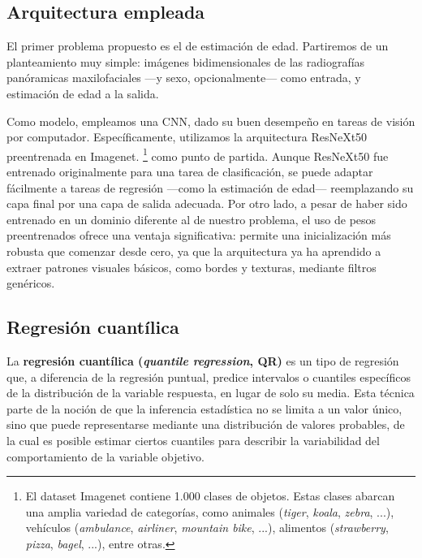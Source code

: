\subsection{Arquitectura empleada}

El primer problema propuesto es el de estimación de edad. Partiremos de un planteamiento muy simple: imágenes 
bidimensionales de las radiografías panóramicas maxilofaciales ---y sexo, opcionalmente---
como entrada, y estimación de edad a la salida.

Como modelo, empleamos una CNN, dado su buen desempeño en tareas de visión por computador. Específicamente,
utilizamos la arquitectura ResNeXt50 \cite{xie2017} preentrenada en Imagenet. 
\footnote{
    El dataset Imagenet contiene 1.000 clases de objetos. Estas clases abarcan una
    amplia variedad de categorías, como animales (\textit{tiger}, \textit{koala}, \textit{zebra}, ...), 
    vehículos (\textit{ambulance}, \textit{airliner}, \textit{mountain bike}, ...), alimentos 
    (\textit{strawberry}, \textit{pizza}, \textit{bagel}, ...), entre otras. 
}
\cite{deng2009} como punto de partida. 
Aunque ResNeXt50 fue entrenado originalmente para una tarea de clasificación, se puede adaptar fácilmente a
tareas de regresión ---como la estimación de edad--- reemplazando su capa final por una capa de salida 
adecuada.
Por otro lado, a pesar de haber sido entrenado en un dominio diferente al de nuestro problema, el uso de 
pesos preentrenados ofrece una ventaja significativa: permite una inicialización más robusta que comenzar 
desde cero, ya que la arquitectura ya ha aprendido a extraer patrones visuales básicos, como bordes y 
texturas, mediante filtros genéricos.


\subsection{Regresión cuantílica}

La \textbf{regresión cuantílica (\textit{quantile regression}, QR)} es un tipo de regresión que, a diferencia
de la regresión puntual, predice intervalos o cuantiles específicos de la distribución de la variable 
respuesta, en lugar de solo su media. Esta técnica parte de la noción de que la inferencia estadística no se 
limita a un valor único, sino que puede representarse mediante una distribución de valores probables, de la
cual es posible estimar ciertos cuantiles para describir la variabilidad del comportamiento de la variable 
objetivo.

